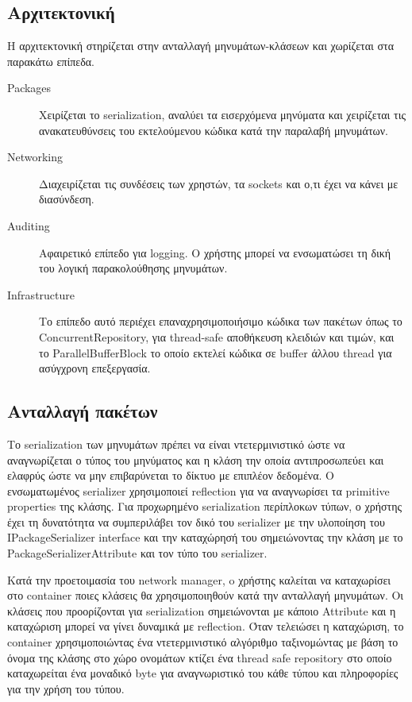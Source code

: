 		\subsection{Αρχιτεκτονική}	
		Η αρχιτεκτονική στηρίζεται στην ανταλλαγή μηνυμάτων-κλάσεων και χωρίζεται στα παρακάτω επίπεδα.
			\begin{description}
				\item [Packages] Χειρίζεται το serialization, αναλύει τα εισερχόμενα μηνύματα και χειρίζεται τις ανακατευθύνσεις του εκτελούμενου κώδικα κατά την παραλαβή μηνυμάτων. 
				\item [Networking] Διαχειρίζεται τις συνδέσεις των χρηστών, τα sockets και ο,τι έχει να κάνει με διασύνδεση.
				\item [Auditing] Αφαιρετικό επίπεδο για logging. Ο χρήστης μπορεί να ενσωματώσει τη δική του λογική παρακολούθησης μηνυμάτων.
				\item [Infrastructure] Το επίπεδο αυτό περιέχει επαναχρησιμοποιήσιμο κώδικα των πακέτων όπως το ConcurrentRepository, για thread-safe αποθήκευση κλειδιών και τιμών, και το ParallelBufferBlock το οποίο εκτελεί κώδικα σε buffer άλλου thread για ασύγχρονη επεξεργασία.
			\end{description}
			
			\subsection{Ανταλλαγή πακέτων}	 
			Το serialization των μηνυμάτων πρέπει να είναι ντετερμινιστικό ώστε να αναγνωρίζεται ο τύπος του μηνύματος και η κλάση την οποία αντιπροσωπεύει και ελαφρύς ώστε να μην επιβαρύνεται το δίκτυο με επιπλέον δεδομένα. Ο ενσωματωμένος serializer χρησιμοποιεί reflection για να αναγνωρίσει τα primitive properties της κλάσης. Για προχωρημένο serialization περίπλοκων τύπων, ο χρήστης έχει τη δυνατότητα να συμπεριλάβει τον δικό του serializer με την υλοποίηση του IPackageSerializer interface και την καταχώρησή του σημειώνοντας την κλάση με το PackageSerializerAttribute και τον τύπο του serializer.
						
			Κατά την προετοιμασία του network manager, o χρήστης καλείται να καταχωρίσει στο container ποιες κλάσεις θα χρησιμοποιηθούν κατά την ανταλλαγή μηνυμάτων. Οι κλάσεις που προορίζονται για serialization σημειώνονται με κάποιο Attribute και η καταχώριση μπορεί να γίνει δυναμικά με reflection.
			Όταν τελειώσει η καταχώριση, το container χρησιμοποιώντας ένα ντετερμινιστικό αλγόριθμο ταξινομώντας με βάση το όνομα της κλάσης στο χώρο ονομάτων κτίζει ένα thread safe repository στο οποίο καταχωρείται ένα μοναδικό byte για αναγνωριστικό του κάθε τύπου και πληροφορίες για την χρήση του τύπου.
			

